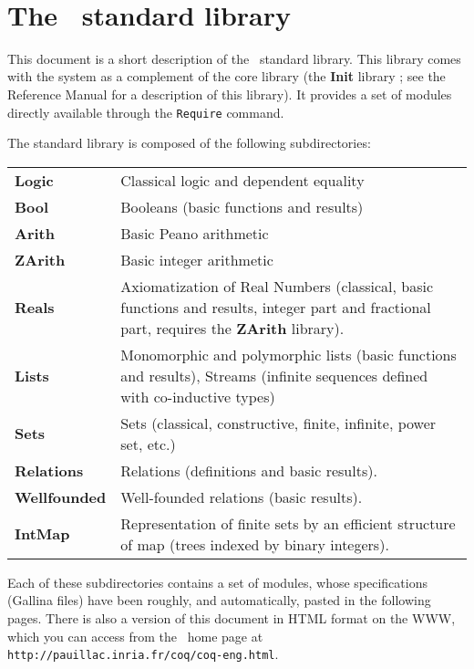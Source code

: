 \documentclass[11pt]{article}
\begin{document}
 
%
{\ }

\tableofcontents

\newpage
\section*{The \Coq\ standard library}

This document is a short description of the \Coq\ standard library.
This library comes with the system as a complement of the core library
(the {\bf Init} library ; see the Reference Manual for a description
of this library). It provides a set of modules directly available
through the \verb!Require! command.

The standard library is composed of the following subdirectories:

\medskip
\begin{tabular}{lp{12cm}}
  {\bf Logic}   & Classical logic and dependent equality \\
  {\bf Bool}    & Booleans (basic functions and results) \\
  {\bf Arith}   & Basic Peano arithmetic \\
  {\bf ZArith}  & Basic integer arithmetic \\
  {\bf Reals}   & Axiomatization of Real Numbers (classical, basic functions 
                  and results, integer part and fractional part,
                  requires the \textbf{ZArith} library).\\
  {\bf Lists}   & Monomorphic and polymorphic lists (basic functions and
                  results), Streams (infinite sequences defined 
                  with co-inductive types) \\
  {\bf Sets}    & Sets (classical, constructive, finite, infinite, power set,
                  etc.) \\
  {\bf Relations}   & Relations (definitions and basic results). \\
  {\bf Wellfounded} & Well-founded relations (basic results). \\
  {\bf IntMap}      & Representation of finite sets by an efficient
                      structure of map (trees indexed by binary integers).\\

\end{tabular}
\medskip

Each of these subdirectories contains a set of modules, whose
specifications ({\sf Gallina} files) have
been roughly, and automatically, pasted in the following pages. There
is also a version of this document in HTML format on the WWW, which
you can access from the \Coq\ home page at
\texttt{http://pauillac.inria.fr/coq/coq-eng.html}.


\end{document}
